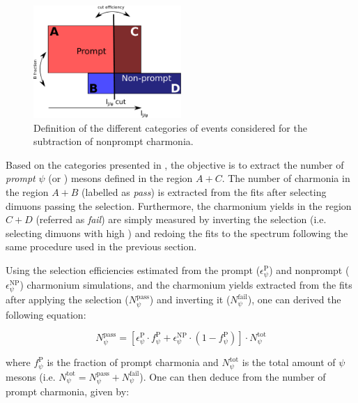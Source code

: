 \begin{figure}[htb!]
 \centering
 \includegraphics[width=0.5\textwidth]{Figures/Charmonia/Analysis/PsiPSignalExtraction/NonPromptCorr/abcd.pdf}
 \caption{Definition of the different categories of events considered for the subtraction of nonprompt charmonia.}
 \label{fig:abcd}
\end{figure}

Based on the categories presented in , the objective is to extract the number of \textit{prompt} $\psi$ (\PsiP or \JPsi) mesons defined in the region $A + C$. The number of charmonia in the region $A + B$ (labelled as \textit{pass}) is extracted from the \mMuMu fits after selecting dimuons passing the \ctau selection. Furthermore, the charmonium yields in the region $C + D$ (referred as \textit{fail}) are simply measured by inverting the \ctau selection (i.e. selecting dimuons with high \ctau) and redoing the fits to the \mMuMu spectrum following the same procedure used in the previous section.

Using the \ctau selection efficiencies estimated from the prompt ($\epsilon^{\text{P}}_{\psi}$) and nonprompt ($\epsilon^{\text{NP}}_{\psi}$) charmonium simulations, and the charmonium yields extracted from the \mMuMu fits after applying the \ctau selection ($N^{\text{pass}}_{\psi}$) and inverting it ($N^{\text{fail}}_{\psi}$), one can derived the following equation:

\begin{equation}
  N^{\text{pass}}_{\psi} = \left[ \epsilon^{\text{P}}_{\psi} \cdot f^{\text{P}}_{\psi} + \epsilon^{\text{NP}}_{\psi} \cdot \left(1-f^{\text{P}}_{\psi}\right) \right] \cdot N^{\text{tot}}_{\psi}
 \label{eq:PassPsiP}
\end{equation}

where $f^{\text{P}}_{\psi}$ is the fraction of prompt charmonia and $N^{\text{tot}}_{\psi}$ is the total amount of $\psi$ mesons (i.e. $N^{\text{tot}}_{\psi} = N^{\text{pass}}_{\psi} +   N^{\text{fail}}_{\psi}$). One can then deduce from  the number of prompt charmonia, given by:

